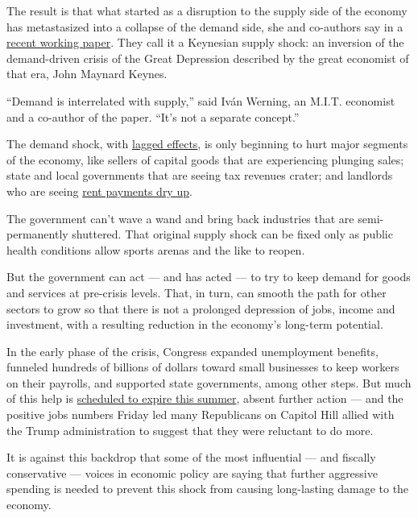 The result is that what started as a disruption to the supply side of
the economy has metastasized into a collapse of the demand side, she and
co-authors say in a
\href{https://bfi.uchicago.edu/wp-content/uploads/BFI_WP_202035.pdf}{recent
working paper}. They call it a Keynesian supply shock: an inversion of
the demand-driven crisis of the Great Depression described by the great
economist of that era, John Maynard Keynes.

``Demand is interrelated with supply,'' said Iván Werning, an M.I.T.
economist and a co-author of the paper. ``It's not a separate concept.''

The demand shock, with
\href{https://www.nytimes3xbfgragh.onion/2020/05/11/upshot/virus-lasting-economic-effects.html}{lagged
effects}, is only beginning to hurt major segments of the economy, like
sellers of capital goods that are experiencing plunging sales; state and
local governments that are seeing tax revenues crater; and landlords who
are seeing
\href{https://www.nytimes3xbfgragh.onion/2020/06/05/business/economy/coronavirus-commercial-real-estate.html}{rent
payments dry up}.

The government can't wave a wand and bring back industries that are
semi-permanently shuttered. That original supply shock can be fixed only
as public health conditions allow sports arenas and the like to reopen.

But the government can act --- and has acted --- to try to keep demand
for goods and services at pre-crisis levels. That, in turn, can smooth
the path for other sectors to grow so that there is not a prolonged
depression of jobs, income and investment, with a resulting reduction in
the economy's long-term potential.

In the early phase of the crisis, Congress expanded unemployment
benefits, funneled hundreds of billions of dollars toward small
businesses to keep workers on their payrolls, and supported state
governments, among other steps. But much of this help is
\href{https://www.nytimes3xbfgragh.onion/2020/05/28/business/economy/coronavirus-stimulus-unemployment.html}{scheduled
to expire this summer}, absent further action --- and the positive jobs
numbers Friday led many Republicans on Capitol Hill allied with the
Trump administration to suggest that they were reluctant to do more.

It is against this backdrop that some of the most influential --- and
fiscally conservative --- voices in economic policy are saying that
further aggressive spending is needed to prevent this shock from causing
long-lasting damage to the economy.

